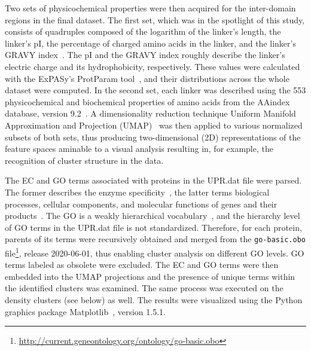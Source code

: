 Two sets of physicochemical properties were then acquired for the inter-domain regions in
the final dataset.
The first set, which was in the spotlight of this study, consists of quadruples composed
of the logarithm of the linker's length, the linker's pI, the percentage
of charged amino acids in the linker, and the linker's GRAVY index~\cite{kyte1982simple}.
The pI and the GRAVY index roughly describe the linker's electric charge and its
hydrophobicity, respectively.
These values were calculated with the ExPASy's ProtParam tool~\cite{gasteiger2005protein},
and their distributions across the whole dataset were computed.
In the second set, each linker was described using the 553 physicochemical and
biochemical properties of amino acids from the AAindex database, version
9.2~\cite{nakai1988cluster, tomii1996analysis, kawashima1999aaindex, kawashima2000aaindex,
kawashima2007aaindex}.
A dimensionality reduction technique Uniform Manifold Approximation and Projection
(UMAP)~\cite{mcinnes2018umap} was then applied to various normalized subsets of both
sets, thus producing two-dimensional (2D) representations of the feature spaces aminable
to a visual analysis resulting in, for example, the recognition of cluster structure in
the data.

The EC and GO terms associated with proteins in the UPR.dat file were parsed.
The former describes the enzyme specificity~\cite{webb1992enzyme}, the latter terms
biological processes, cellular components, and molecular functions of genes and their
products~\cite{ashburner2000gene, gene2019gene}.
The GO is a weakly hierarchical vocabulary~\cite{ashburner2000gene}, and the hierarchy
level of GO terms in the UPR.dat file is not standardized.
Therefore, for each protein, parents of its terms were recursively obtained and merged
from the \texttt{go-basic.obo}
file\footnote{\url{http://current.geneontology.org/ontology/go-basic.obo}}, release
2020-06-01, thus enabling cluster analysis on different GO levels.
GO terms labeled as obsolete were excluded.
The EC and GO terms were then embedded into the UMAP projections and the presence of
unique terms within the identified clusters was examined.
The same process was executed on the density clusters (see below) as well.
The results were visualized using the Python graphics package
Matplotlib~\cite{hunter2007matplotlib}, version 1.5.1.

